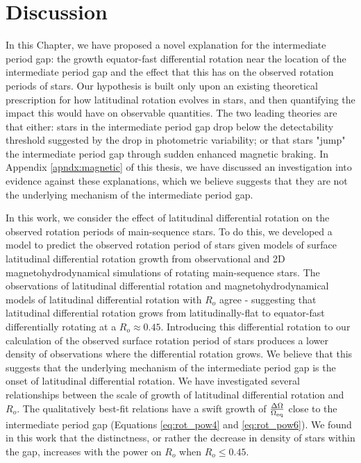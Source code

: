 \section{Discussion}
\label{sec:discussion}

In this Chapter, we have proposed a novel explanation for the intermediate period gap: the growth equator-fast differential rotation near the location of the intermediate period gap and the effect that this has on the observed rotation periods of stars.
Our hypothesis is built only upon an existing theoretical prescription for how latitudinal rotation evolves in stars, and then quantifying the impact this would have on observable quantities.
The two leading theories are that either: stars in the intermediate period gap drop below the detectability threshold suggested by the drop in photometric variability; or that stars "jump" the intermediate period gap through sudden enhanced magnetic braking.
In Appendix \ref{apndx:magnetic} of this thesis, we have discussed an investigation into evidence against these explanations, which we believe suggests that they are not the underlying mechanism of the intermediate period gap.

In this work, we consider the effect of latitudinal differential rotation on the observed rotation periods of main-sequence stars.
To do this, we developed a model to predict the observed rotation period of stars given models of surface latitudinal differential rotation growth from observational and 2D magnetohydrodynamical simulations of rotating main-sequence stars.
The observations of latitudinal differential rotation and magnetohydrodynamical models of latitudinal differential rotation with $R_o$ agree - suggesting that latitudinal differential rotation grows from latitudinally-flat to equator-fast differentially rotating at a $R_o \approx 0.45$.
Introducing this differential rotation to our calculation of the observed surface rotation period of stars produces a lower density of observations where the differential rotation grows.
We believe that this suggests that the underlying mechanism of the intermediate period gap is the onset of latitudinal differential rotation.
We have investigated several relationships between the scale of growth of latitudinal differential rotation and $R_o$. The qualitatively best-fit relations have a swift growth of $\frac{\Delta\Omega}{\Omega_{\rm{eq}}}$ close to the intermediate period gap (Equations \ref{eq:rot_pow4} and \ref{eq:rot_pow6}).
We found in this work that the distinctness, or rather the decrease in density of stars within the gap, increases with the power on $R_o$ when $R_o \leq 0.45$.

